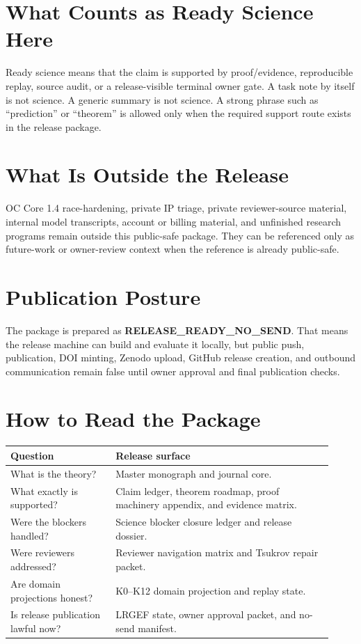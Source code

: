 \documentclass[11pt,a4paper]{article}
\begin{document}
\section*{What Counts as Ready Science Here}
Ready science means that the claim is supported by proof/evidence, reproducible replay, source audit, or a release-visible terminal owner gate. A task note by itself is not science. A generic summary is not science. A strong phrase such as ``prediction'' or ``theorem'' is allowed only when the required support route exists in the release package.

\section*{What Is Outside the Release}
OC Core 1.4 race-hardening, private IP triage, private reviewer-source material, internal model transcripts, account or billing material, and unfinished research programs remain outside this public-safe package. They can be referenced only as future-work or owner-review context when the reference is already public-safe.

\section*{Publication Posture}
The package is prepared as \textbf{RELEASE\_READY\_NO\_SEND}. That means the release machine can build and evaluate it locally, but public push, publication, DOI minting, Zenodo upload, GitHub release creation, and outbound communication remain false until owner approval and final publication checks.

\section*{How to Read the Package}
\begin{longtable}{>{\raggedright\arraybackslash}p{0.30\linewidth}>{\raggedright\arraybackslash}p{0.62\linewidth}}
\textbf{Question} & \textbf{Release surface}\\
\hline
What is the theory? & Master monograph and journal core.\\
What exactly is supported? & Claim ledger, theorem roadmap, proof machinery appendix, and evidence matrix.\\
Were the blockers handled? & Science blocker closure ledger and release dossier.\\
Were reviewers addressed? & Reviewer navigation matrix and Tsukrov repair packet.\\
Are domain projections honest? & K0--K12 domain projection and replay state.\\
Is release publication lawful now? & LRGEF state, owner approval packet, and no-send manifest.\\
\end{longtable}
\end{document}
